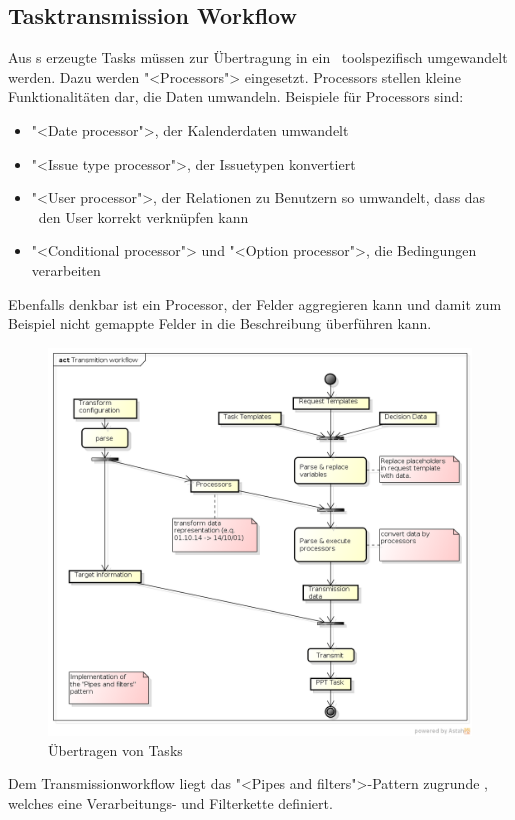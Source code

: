 		
		\subsection{Tasktransmission Workflow}
			\label{subsec:transmissionWorkflow}		
		
			Aus \ttpl s erzeugte Tasks müssen zur Übertragung in ein \ppt\
			toolspezifisch umgewandelt werden. Dazu werden "<Processors"> eingesetzt.
			Processors stellen kleine Funktionalitäten dar, die Daten umwandeln.
			Beispiele für Processors sind:
			\begin{itemize}
				\item "<Date processor">, der Kalenderdaten umwandelt
				\item "<Issue type processor">, der Issuetypen konvertiert
				\item "<User processor">, der Relationen zu Benutzern so umwandelt, dass das \ppt\ den User korrekt verknüpfen kann
				\item "<Conditional processor"> und "<Option processor">, die Bedingungen verarbeiten
			\end{itemize}
			Ebenfalls denkbar ist ein Processor, der Felder aggregieren kann und damit zum Beispiel nicht gemappte Felder in die Beschreibung überführen kann.
			
			\begin{figure}[H]
				\includegraphics[width=\textwidth]{architecture/media/img/transmissionWorkflow.png}
				\centering
				\caption{Übertragen von Tasks}
				\label{fig:transmissionWorkflow}
			\end{figure}
			Dem Transmissionworkflow liegt das "<Pipes and filters">-Pattern zugrunde
			 \cite{hope_enterprise_2003}, welches eine Verarbeitungs- und Filterkette definiert.
			
